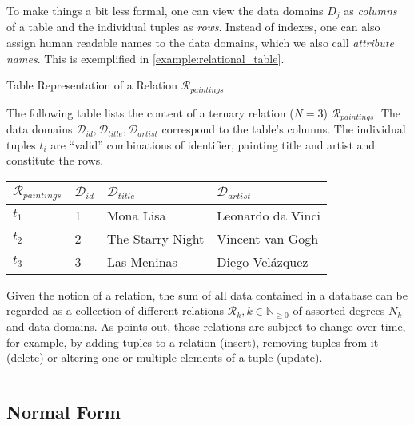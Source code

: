 To make things a bit less formal, one can view the data domains $D_j$ as \emph{columns} of a table and the individual tuples as \emph{rows}. Instead of indexes, one can also assign human readable names to the data domains, which we also call \emph{attribute names}. This is exemplified in \cref{example:relational_table}. 

\begin{example}[label=example:relational_table]{Table Representation of a Relation $\mathcal{R}_{paintings}$}{}
    
The following table lists the content of a ternary relation ($N = 3$) $\mathcal{R}_{paintings}$. The data domains $\mathcal{D}_{id}, \mathcal{D}_{title}, \mathcal{D}_{artist}$ correspond to the table's columns. The individual tuples $t_i$ are ``valid'' combinations of identifier, painting title and artist and constitute the rows.
    
    \begin{center}
        \begin{tabular}{ l || l | l | l |}
         $\mathcal{R}_{paintings}$ & $\mathcal{D}_{id}$ & $\mathcal{D}_{title}$  & $\mathcal{D}_{artist}$ \\ 
         \hline
         \hline
         $t_1$ &  1 & Mona Lisa &  Leonardo da Vinci \\
         \hline
         $t_2$ &  2 & The Starry Night & Vincent van Gogh \\
         \hline
         $t_3$ &  3 & Las Meninas & Diego Velázquez \\
         \hline
        \end{tabular}
    \end{center}
\end{example}


Given the notion of a relation, the sum of all data contained in a database can be regarded as a collection of different relations $\mathcal{R}_k, k \in \mathbb{N}_{\geq 0}$ of assorted degrees $N_k$ and data domains. As \cite{Codd:1970Relational} points out, those relations are subject to change over time, for example, by adding tuples to a relation (insert), removing tuples from it (delete) or altering one or multiple elements of a tuple (update).


\begin{equation}
    
\end{equation}


\subsection{Normal Form}

